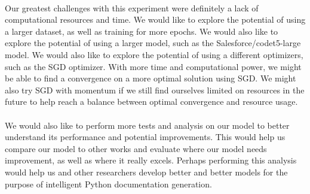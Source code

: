 \documentclass[12pt]{article}
\begin{document}
	\paragraph{} Our greatest challenges with this experiment were definitely a lack of computational resources and time. We would like to explore the potential of using a larger dataset, as well as training for more epochs. We would also like to explore the potential of using a larger model, such as the Salesforce/codet5-large model. We would also like to explore the potential of using a different optimizers, such as the SGD optimizer. With more time and computational power, we might be able to find a convergence on a more optimal solution using SGD. We might also try SGD with momentum if we still find ourselves limited on resources in the future to help reach a balance between optimal convergence and resource usage.
	\paragraph{} We would also like to perform more tests and analysis on our model to better understand its performance and potential improvements. This would help us compare our model to other works and evaluate where our model needs improvement, as well as where it really excels. Perhaps performing this analysis would help us and other researchers develop better and better models for the purpose of intelligent Python documentation generation.

	\pagebreak
	
	
\end{document}
